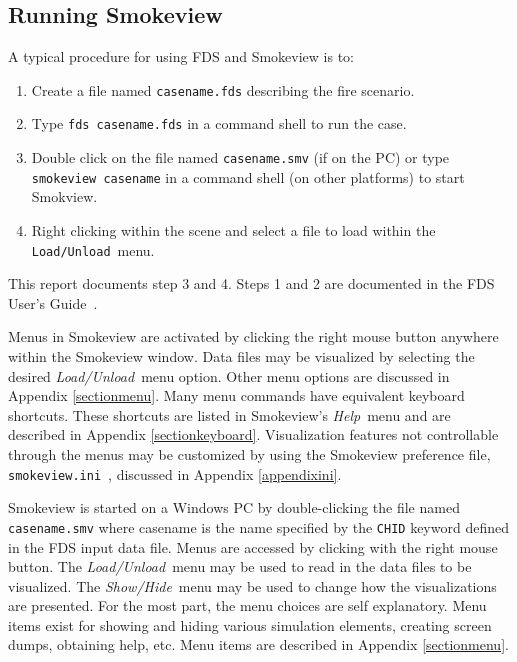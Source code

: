 \documentclass[11pt,twoside]{book}
\newcommand{\svini}{{\tt smokeview.ini}\ }
\begin{document}

\subsection{Running Smokeview}

A typical procedure for using FDS and Smokeview is to:
\begin{enumerate}

\item Create a file named {\tt casename.fds} describing the fire
scenario.

\item Type {\tt fds~casename.fds} in a command shell to run the
case.

\item Double click on the file named {\tt casename.smv} (if on the
PC) or type {\tt smokeview~casename} in a command shell (on other
platforms) to start Smokview.

\item Right clicking within the scene and select a file to load
within the {\tt Load/Unload}\ menu.
\end{enumerate}

\noindent This report documents step 3 and 4. Steps 1 and 2 are
documented in the FDS User's Guide~\cite{FDS_Users_Guide}.

Menus in Smokeview are activated by clicking the right mouse
button anywhere within the Smokeview window.  Data files may be
visualized by selecting the desired {\em Load/Unload}\ menu
option. Other menu options are discussed in Appendix
\ref{sectionmenu}. Many menu commands have equivalent keyboard
shortcuts. These shortcuts are listed in Smokeview's {\em Help}\
menu and are described in Appendix \ref{sectionkeyboard}.
Visualization features not controllable through the menus may be
customized by using the Smokeview preference file, \svini,
discussed in Appendix \ref{appendixini}.

Smokeview  is started on a Windows PC by double-clicking the file
named {\tt casename.smv} where casename is the name specified by
the {\tt CHID} keyword defined in the FDS input data file. Menus
are accessed by clicking with the right mouse button.  The {\em
Load/Unload}\ menu may be used to read in the data files to be
visualized. The {\em Show/Hide}\ menu may be used to change how
the visualizations are presented. For the most part, the menu
choices are self explanatory. Menu items exist for showing and
hiding various simulation elements, creating screen dumps,
obtaining help, etc. Menu items are described in Appendix
\ref{sectionmenu}.
\end{document}
